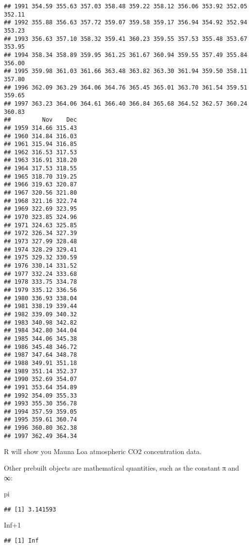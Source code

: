 \documentclass[
]{article}
\newenvironment{Shaded}{\begin{snugshade}}{\end{snugshade}}
\newcommand{\ConstantTok}[1]{\textcolor[rgb]{0.00,0.00,0.00}{#1}}
\newcommand{\DecValTok}[1]{\textcolor[rgb]{0.00,0.00,0.81}{#1}}
\newcommand{\NormalTok}[1]{#1}
\newcommand{\SpecialCharTok}[1]{\textcolor[rgb]{0.00,0.00,0.00}{#1}}
\begin{document}
\begin{verbatim}
## 1991 354.59 355.63 357.03 358.48 359.22 358.12 356.06 353.92 352.05 352.11
## 1992 355.88 356.63 357.72 359.07 359.58 359.17 356.94 354.92 352.94 353.23
## 1993 356.63 357.10 358.32 359.41 360.23 359.55 357.53 355.48 353.67 353.95
## 1994 358.34 358.89 359.95 361.25 361.67 360.94 359.55 357.49 355.84 356.00
## 1995 359.98 361.03 361.66 363.48 363.82 363.30 361.94 359.50 358.11 357.80
## 1996 362.09 363.29 364.06 364.76 365.45 365.01 363.70 361.54 359.51 359.65
## 1997 363.23 364.06 364.61 366.40 366.84 365.68 364.52 362.57 360.24 360.83
##         Nov    Dec
## 1959 314.66 315.43
## 1960 314.84 316.03
## 1961 315.94 316.85
## 1962 316.53 317.53
## 1963 316.91 318.20
## 1964 317.53 318.55
## 1965 318.70 319.25
## 1966 319.63 320.87
## 1967 320.56 321.80
## 1968 321.16 322.74
## 1969 322.69 323.95
## 1970 323.85 324.96
## 1971 324.63 325.85
## 1972 326.34 327.39
## 1973 327.99 328.48
## 1974 328.29 329.41
## 1975 329.32 330.59
## 1976 330.14 331.52
## 1977 332.24 333.68
## 1978 333.75 334.78
## 1979 335.12 336.56
## 1980 336.93 338.04
## 1981 338.19 339.44
## 1982 339.09 340.32
## 1983 340.98 342.82
## 1984 342.80 344.04
## 1985 344.06 345.38
## 1986 345.48 346.72
## 1987 347.64 348.78
## 1988 349.91 351.18
## 1989 351.14 352.37
## 1990 352.69 354.07
## 1991 353.64 354.89
## 1992 354.09 355.33
## 1993 355.30 356.78
## 1994 357.59 359.05
## 1995 359.61 360.74
## 1996 360.80 362.38
## 1997 362.49 364.34
\end{verbatim}

R will show you Mauna Loa atmospheric CO2 concentration data.

Other prebuilt objects are mathematical quantities, such as the constant
π and ∞:

\begin{Shaded}
\begin{Highlighting}[]
\NormalTok{pi}
\end{Highlighting}
\end{Shaded}

\begin{verbatim}
## [1] 3.141593
\end{verbatim}

\begin{Shaded}
\begin{Highlighting}[]
\ConstantTok{Inf}\SpecialCharTok{+}\DecValTok{1}
\end{Highlighting}
\end{Shaded}

\begin{verbatim}
## [1] Inf
\end{verbatim}
\end{document}
